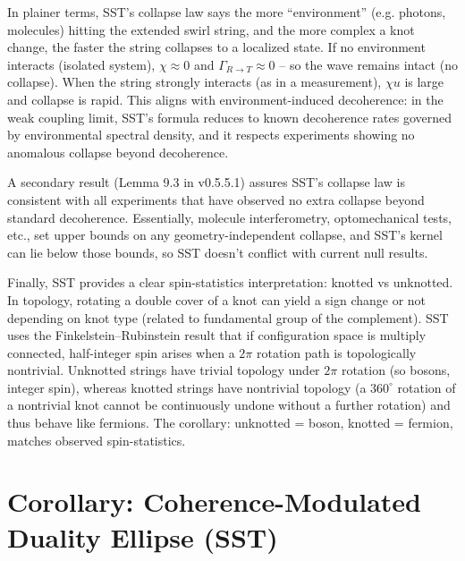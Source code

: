 \documentclass[reprint,aps,onecolumn,nofootinbib]{revtex4-2}
\begin{document}
	\noindent In plainer terms, SST’s collapse law says the more “environment” (e.g. photons, molecules) hitting the extended swirl string, and the more complex a knot change, the faster the string collapses to a localized state. If no environment interacts (isolated system), $\chi \approx 0$ and $\Gamma_{R\to T}\approx 0$ – so the wave remains intact (no collapse). When the string strongly interacts (as in a measurement), $\chi u$ is large and collapse is rapid. This aligns with environment-induced decoherence: in the weak coupling limit, SST’s formula reduces to known decoherence rates governed by environmental spectral density, and it respects experiments showing no anomalous collapse beyond decoherence.

	A secondary result (Lemma 9.3 in v0.5.5.1) assures SST’s collapse law is consistent with all experiments that have observed no extra collapse beyond standard decoherence. Essentially, molecule interferometry, optomechanical tests, etc., set upper bounds on any geometry-independent collapse, and SST’s kernel can lie below those bounds, so SST doesn’t conflict with current null results.

	Finally, SST provides a clear spin-statistics interpretation: knotted vs unknotted. In topology, rotating a double cover of a knot can yield a sign change or not depending on knot type (related to fundamental group of the complement). SST uses the Finkelstein–Rubinstein result that if configuration space is multiply connected, half-integer spin arises when a $2\pi$ rotation path is topologically nontrivial. Unknotted strings have trivial topology under $2\pi$ rotation (so bosons, integer spin), whereas knotted strings have nontrivial topology (a $360^\circ$ rotation of a nontrivial knot cannot be continuously undone without a further rotation) and thus behave like fermions. The corollary: unknotted = boson, knotted = fermion, matches observed spin-statistics.




    \section{Corollary: Coherence-Modulated Duality Ellipse (SST)}
    \label{sec:duality-ellipse-sst}
\end{document}
